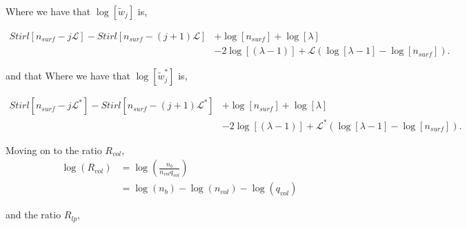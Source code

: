 \documentclass[12pt,letterpaper]{article}
\newcommand{\leng}{\mathcal{L}}
\newcommand{\lr}[1]{\left( #1 \right)}
\newcommand{\lrb}[1]{\left[ #1 \right]}
\begin{document}
Where we have that 
$
\log
\lrb{
   \tilde{w}_{j} 
}
$
is,

\begin{align}
   Stirl
   \lrb{
        n_{surf}
        -
        j
        \leng
    }
    -
    Stirl
    \lrb{
            n_{surf}
            -
        (j+1)
        \leng
   }
   &+
   \log
   \lrb{
    n_{surf}
    }
    +
    \log
   \lrb{
        \lambda
   }\nonumber\\
   &
   -
   2
   \log
   \lrb{
        (\lambda-1)
   }
   +
   \leng
   \left(
    \log
    \lrb{
            \lambda
            -
            1
    }
    -
    \log
    \lrb{
            n_{surf}
        }
    \right)
    .
    \label{wk2logsupp}
\end{align}

and that Where we have that 
$
\log
\lrb{
   \tilde{w}^{*}_{j} 
}
$
is,

\begin{align}
   Stirl
   \lrb{
        n_{surf}
        -
        j
        \leng^{*}
    }
    -
    Stirl
    \lrb{
            n_{surf}
            -
        (j+1)
        \leng^{*}
   }
   &+
   \log
   \lrb{
    n_{surf}
    }
    +
    \log
   \lrb{
        \lambda
   }\nonumber\\
   &
   -
   2
   \log
   \lrb{
        (\lambda-1)
   }
   +
   \leng^{*}
   \left(
    \log
    \lrb{
            \lambda
            -
            1
    }
    -
    \log
    \lrb{
            n_{surf}
        }
    \right)
    .
    \label{wk2logsupp}
\end{align}


Moving on to the ratio $R_{vol}$,
\begin{align}
     \log
     \lr{
        R_{vol}
    }
    &=
    \log
    \lr{
    	\frac{
		    n_b
		}{
		    n_{vol} q_{vol}
		}
    }\\
    &=
    \log
    \lr{
        n_b
    }
    -
    \log
    \lr{
        n_{vol}
    }
    -
    \log
    \lr{
        q_{vol}
    }    
\end{align}

and the ratio $R_{lp}$,
\end{document}
